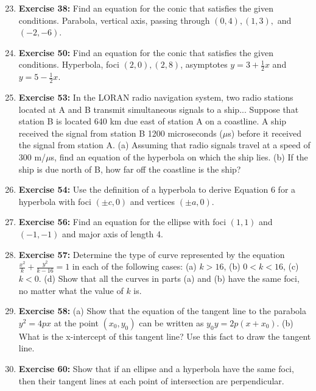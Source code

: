 \documentclass[12pt, a4paper]{article}
\begin{document}
\begin{enumerate}
    \setcounter{enumi}{22}
    \item \textbf{Exercise 38:} Find an equation for the conic that satisfies the given conditions. Parabola, vertical axis, passing through $(0, 4), (1, 3),$ and $(-2, -6)$.

    \item \textbf{Exercise 50:} Find an equation for the conic that satisfies the given conditions. Hyperbola, foci $(2, 0), (2, 8)$, asymptotes $y = 3 + \frac{1}{2}x$ and $y = 5 - \frac{1}{2}x$.

    \item \textbf{Exercise 53:} In the LORAN radio navigation system, two radio stations located at A and B transmit simultaneous signals to a ship... Suppose that station B is located 640 km due east of station A on a coastline. A ship received the signal from station B 1200 microseconds ($\mu$s) before it received the signal from station A. (a) Assuming that radio signals travel at a speed of 300 m/$\mu$s, find an equation of the hyperbola on which the ship lies. (b) If the ship is due north of B, how far off the coastline is the ship?

    \item \textbf{Exercise 54:} Use the definition of a hyperbola to derive Equation 6 for a hyperbola with foci $(\pm c, 0)$ and vertices $(\pm a, 0)$.

    \item \textbf{Exercise 56:} Find an equation for the ellipse with foci $(1, 1)$ and $(-1, -1)$ and major axis of length 4.

    \item \textbf{Exercise 57:} Determine the type of curve represented by the equation $\frac{x^2}{k} + \frac{y^2}{k-16} = 1$ in each of the following cases: (a) $k > 16$, (b) $0 < k < 16$, (c) $k < 0$. (d) Show that all the curves in parts (a) and (b) have the same foci, no matter what the value of $k$ is.

    \item \textbf{Exercise 58:} (a) Show that the equation of the tangent line to the parabola $y^2 = 4px$ at the point $(x_0, y_0)$ can be written as $y_0 y = 2p(x + x_0)$. (b) What is the x-intercept of this tangent line? Use this fact to draw the tangent line.

    \item \textbf{Exercise 60:} Show that if an ellipse and a hyperbola have the same foci, then their tangent lines at each point of intersection are perpendicular.
\end{enumerate}
\end{document}
